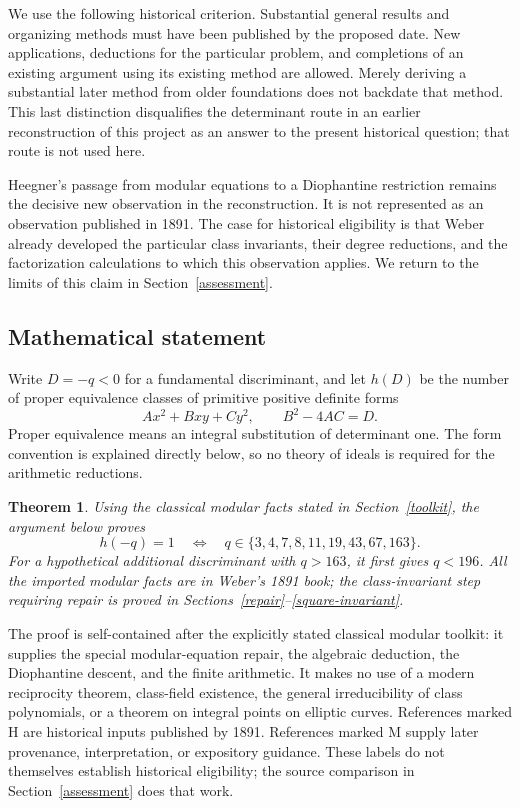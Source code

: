 \documentclass[11pt]{article}
\newtheorem{theorem}{Theorem}
\begin{document}
We use the following historical criterion. Substantial general results
and organizing methods must have been published by the proposed date.
New applications, deductions for the particular problem, and completions
of an existing argument using its existing method are allowed. Merely
deriving a substantial later method from older foundations does not
backdate that method. This last distinction disqualifies the determinant
route in an earlier reconstruction of this project as an answer to the
present historical question; that route is not used here.

Heegner's passage from modular equations to a Diophantine restriction
\cite{heegner} remains the decisive new observation in the reconstruction.
It is not represented as an observation published in 1891. The case for
historical eligibility is that Weber already developed the particular
class invariants, their degree reductions, and the factorization
calculations to which this observation applies. We return to the limits
of this claim in Section~\ref{assessment}.

\subsection{Mathematical statement}

Write \(D=-q<0\) for a fundamental discriminant, and let \(h(D)\)
be the number of proper equivalence classes of primitive positive
definite forms
\[
 Ax^2+Bxy+Cy^2,\qquad B^2-4AC=D.
\]
Proper equivalence means an integral substitution of determinant one.
The form convention is explained directly below, so no theory of ideals
is required for the arithmetic reductions.

\begin{theorem}\label{main}
Using the classical modular facts stated in Section~\ref{toolkit},
the argument below proves
\[
 h(-q)=1\quad\Longleftrightarrow\quad
 q\in\{3,4,7,8,11,19,43,67,163\}.
\]
For a hypothetical additional discriminant with \(q>163\), it first
gives \(q<196\). All the imported modular facts are in Weber's 1891
book; the class-invariant step requiring repair is proved in
Sections~\ref{repair}--\ref{square-invariant}.
\end{theorem}

The proof is self-contained after the explicitly stated classical
modular toolkit: it supplies the special modular-equation repair, the
algebraic deduction, the Diophantine descent, and the finite arithmetic.
It makes no use of a modern reciprocity theorem, class-field existence,
the general irreducibility of class polynomials, or a theorem on integral
points on elliptic curves. References marked H are historical inputs
published by 1891. References marked M supply later provenance,
interpretation, or expository guidance. These labels do not themselves
establish historical eligibility; the source comparison in
Section~\ref{assessment} does that work.
\end{document}
